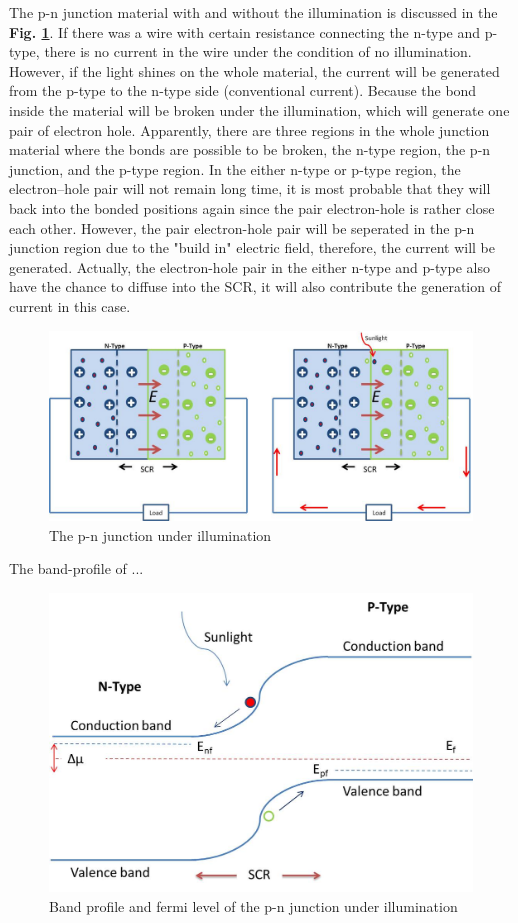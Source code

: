 \documentclass[a4paper, 12pt, titlepage,oneside,drop]{kthesis}
\begin{document}
The p-n junction material with and without the illumination is discussed in the \textbf{Fig. \ref{illu}}. If there was a wire with certain resistance connecting the n-type and p-type, there is no current in the wire under the condition of no illumination. However, if the light shines on the whole material, the current will be generated from the 
p-type to the n-type side (conventional current). Because the bond inside the material will be broken under the illumination, which will generate one pair of electron hole. Apparently, there are three regions in the whole junction material where the bonds are possible to be broken, the n-type region, the p-n junction, and
the p-type region. In the either n-type or p-type region, the electron–hole pair will not remain long time,  it is most probable that they will back into the bonded positions again since the pair electron-hole is rather close each other. However, the pair
electron-hole pair will be seperated in the p-n junction region due to the "build in" electric field, therefore, the current will be generated. Actually, the electron-hole pair in the either n-type and p-type also have the chance to diffuse into 
the SCR, it will also contribute the generation of current in this case.

\begin{figure}[H]
\centering
\includegraphics[scale=0.5]{illumination.jpg}
\caption{The p-n junction under illumination}
\label{illu}
\end{figure}

The band-profile of ...


\begin{figure}[H]
\centering
\includegraphics[scale=0.45]{illumination1.jpg}
\caption{Band profile and fermi level of the p-n junction under illumination}
\label{illu1}
\end{figure}
\end{document}
